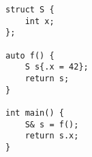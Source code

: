 \begin{lstlisting}[title=\href{https://godbolt.org/z/pEgJ6W}{\texttt{godbolt.org/z/pEgJ6W}}]
struct S {
    int x;
};

auto f() {
    S s{.x = 42};
    return s;
}

int main() {
    S& s = f();
    return s.x;
}
\end{lstlisting}
